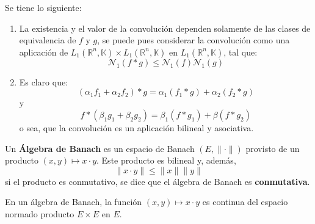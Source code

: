 \documentclass[12pt]{report}
\theoremstyle{largebreak}
\newcommand\norm[1]{\ensuremath{\|#1\|}}
\newcommand{\N}[2]{\ensuremath{\mathcal{N}_{#1}\left(#2\right)}}
\begin{document}
    \begin{obs}
        Se tiene lo siguiente:
        \begin{enumerate}
            \item La existencia y el valor de la convolución dependen solamente de las clases de equivalencia de $f$ y $g$, se puede pues considerar la convolución como una aplicación de $L_1(\mathbb{R}^n,\mathbb{K})\times L_1(\mathbb{R}^n,\mathbb{K})$ en $L_1(\mathbb{R}^n,\mathbb{K})$, tal que:
            \begin{equation*}
                \N{1}{f*g}\leq \N{1}{f}\N{1}{g}
            \end{equation*}
            \item Es claro que:
            \begin{equation*}
                (\alpha_1f_1+\alpha_2f_2)*g=\alpha_1(f_1*g)+\alpha_2(f_2*g)
            \end{equation*}
            y
            \begin{equation*}
                f*(\beta_1g_1+\beta_2g_2)=\beta_1(f*g_1)+\beta(f*g_2)
            \end{equation*}
            o sea, que la convolución es un aplicación bilineal y asociativa.
        \end{enumerate}
    \end{obs}

    \begin{mydef}
        Un \textbf{Álgebra de Banach} es un espacio de Banach $(E,\norm{\cdot})$ provisto de un producto $(x,y)\mapsto x\cdot y$. Este producto es bilineal y, además,
        \begin{equation*}
            \norm{x\cdot y}\leq \norm{x}\norm{y}
        \end{equation*}
        si el producto es conmutativo, se dice que el álgebra de Banach es \textbf{conmutativa}.
    \end{mydef}

    \begin{excer}
        En un álgebra de Banach, la función $(x,y)\mapsto x\cdot y$ es continua del espacio normado producto $E\times E$ en $E$.
    \end{excer}
\end{document}
